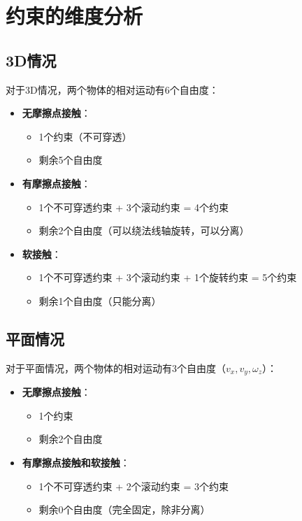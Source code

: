 \documentclass[12pt,a4paper]{article}
\begin{document}
\section{约束的维度分析}

\subsection{3D情况}

对于3D情况，两个物体的相对运动有6个自由度：

\begin{itemize}
\item \textbf{无摩擦点接触}：
  \begin{itemize}
  \item 1个约束（不可穿透）
  \item 剩余5个自由度
  \end{itemize}

\item \textbf{有摩擦点接触}：
  \begin{itemize}
  \item 1个不可穿透约束 + 3个滚动约束 = 4个约束
  \item 剩余2个自由度（可以绕法线轴旋转，可以分离）
  \end{itemize}

\item \textbf{软接触}：
  \begin{itemize}
  \item 1个不可穿透约束 + 3个滚动约束 + 1个旋转约束 = 5个约束
  \item 剩余1个自由度（只能分离）
  \end{itemize}
\end{itemize}

\subsection{平面情况}

对于平面情况，两个物体的相对运动有3个自由度（$v_x, v_y, \omega_z$）：

\begin{itemize}
\item \textbf{无摩擦点接触}：
  \begin{itemize}
  \item 1个约束
  \item 剩余2个自由度
  \end{itemize}

\item \textbf{有摩擦点接触和软接触}：
  \begin{itemize}
  \item 1个不可穿透约束 + 2个滚动约束 = 3个约束
  \item 剩余0个自由度（完全固定，除非分离）
  \end{itemize}
\end{itemize}
\end{document}
